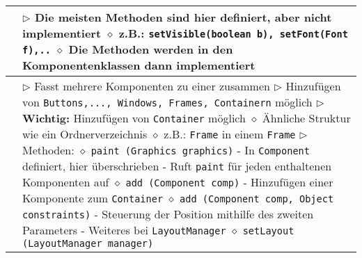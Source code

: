 \begin{longtable}{ | p{} p{} | }
	\makecell[l]{Klasse Component} & \makecell[l]{
	$\rhd$ Die meisten Methoden sind hier definiert, aber nicht implementiert \\
	\hspace{0.4cm} $\diamond$ z.B.: \texttt{setVisible(boolean b), setFont(Font f),..} \\
	\hspace{0.4cm} $\diamond$ Die Methoden werden in den Komponentenklassen dann implementiert} \\ \hline

	\makecell[l]{Klasse Container} & \makecell[l]{
	$\rhd$ Fasst mehrere Komponenten zu einer zusammen \\
	$\rhd$ Hinzufügen von \texttt{Buttons,..., Windows, Frames, Containern} möglich \\
	$\rhd$ \textbf{Wichtig:} Hinzufügen von \texttt{Container} möglich \\
	\hspace{0.4cm} $\diamond$ Ähnliche Struktur wie ein Ordnerverzeichnis \\
	\hspace{0.4cm} $\diamond$ z.B.: \texttt{Frame} in einem \texttt{Frame} \\
	$\rhd$ Methoden: \\
	\hspace{0.4cm} $\diamond$ \texttt{paint (Graphics graphics)} \\
	\hspace{0.6cm} - In \texttt{Component} definiert, hier überschrieben \\
	\hspace{0.6cm} - Ruft \texttt{paint} für jeden enthaltenen Komponenten auf \\
	\hspace{0.4cm} $\diamond$ \texttt{add (Component comp)} \\
	\hspace{0.6cm} - Hinzufügen einer Komponente zum \texttt{Container} \\
	\hspace{0.4cm} $\diamond$ \texttt{add (Component comp, Object constraints)} \\
	\hspace{0.6cm} - Steuerung der Position mithilfe des zweiten Parameters \\ \\
	\hspace{0.6cm} - Weiteres bei \texttt{LayoutManager} \\
	\hspace{0.4cm} $\diamond$ \texttt{setLayout (LayoutManager manager)} \\
}
\end{longtable}
